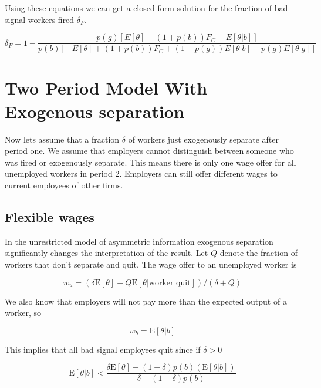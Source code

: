 \documentclass[11pt]{article}
\newcommand{\E}{\mathrm{E}}
\begin{document}
Using these equations we can get a closed form solution for the fraction of bad signal workers fired $\delta_F$. 

$$ \delta_F = 1- \frac{p(g) \left[ E[\theta] - (1 + p(b))F_C - E[\theta|b] \right]}{p(b) \left[ -E[\theta] + (1+p(b))F_C + (1+p(g))E[\theta|b] - p(g)E[\theta|g] \right]}$$







\section{Two Period Model With Exogenous separation }

Now lets assume that a fraction $\delta$ of workers just exogenously separate after period one. We assume that employers cannot distinguish between someone who was fired or exogenously separate. This means there is only one wage offer for all unemployed workers in period 2. Employers can still offer different wages to current employees of other firms. 

\subsection{Flexible wages}

In the unrestricted model of asymmetric information exogenous separation significantly changes the interpretation of the result. Let $Q$ denote the fraction of workers that don't separate and quit. The wage offer to an unemployed worker is   

$$ w_u = (\delta \E[\theta] + Q \E[\theta | \text{worker quit}])/(\delta + Q)$$

We also know that employers will not pay more than the expected output of a worker, so 

$$ w_b = \E[\theta | b] $$

This implies that all bad signal employees quit since if $\delta > 0$ 

$$ \E[\theta|b] < \frac{ \delta \E[\theta] + (1-\delta)p(b)( \E[\theta | b])}{\delta + (1-\delta)p(b)}$$
\end{document}
